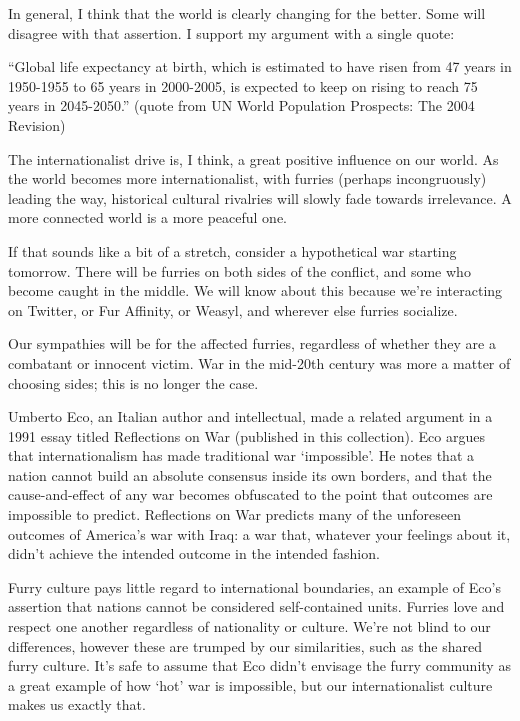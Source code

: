 In general, I think that the world is clearly changing for the better. Some will disagree with that assertion. I support my argument with a single quote:

“Global life expectancy at birth, which is estimated to have risen from 47 years in 1950-1955 to 65 years in 2000-2005, is expected to keep on rising to reach 75 years in 2045-2050.” (quote from UN World Population Prospects: The 2004 Revision)

The internationalist drive is, I think, a great positive influence on our world. As the world becomes more internationalist, with furries (perhaps incongruously) leading the way, historical cultural rivalries will slowly fade towards irrelevance. A more connected world is a more peaceful one.

If that sounds like a bit of a stretch, consider a hypothetical war starting tomorrow. There will be furries on both sides of the conflict, and some who become caught in the middle. We will know about this because we're interacting on Twitter, or Fur Affinity, or Weasyl, and wherever else furries socialize.

Our sympathies will be for the affected furries, regardless of whether they are a combatant or innocent victim. War in the mid-20th century was more a matter of choosing sides; this is no longer the case.

Umberto Eco, an Italian author and intellectual, made a related argument in a 1991 essay titled Reflections on War (published in this collection). Eco argues that internationalism has made traditional war `impossible'. He notes that a nation cannot build an absolute consensus inside its own borders, and that the cause-and-effect of any war becomes obfuscated to the point that outcomes are impossible to predict. Reflections on War predicts many of the unforeseen outcomes of America's war with Iraq: a war that, whatever your feelings about it, didn't achieve the intended outcome in the intended fashion.

Furry culture pays little regard to international boundaries, an example of Eco's assertion that nations cannot be considered self-contained units. Furries love and respect one another regardless of nationality or culture. We're not blind to our differences, however these are trumped by our similarities, such as the shared furry culture. It's safe to assume that Eco didn't envisage the furry community as a great example of how `hot' war is impossible, but our internationalist culture makes us exactly that.

